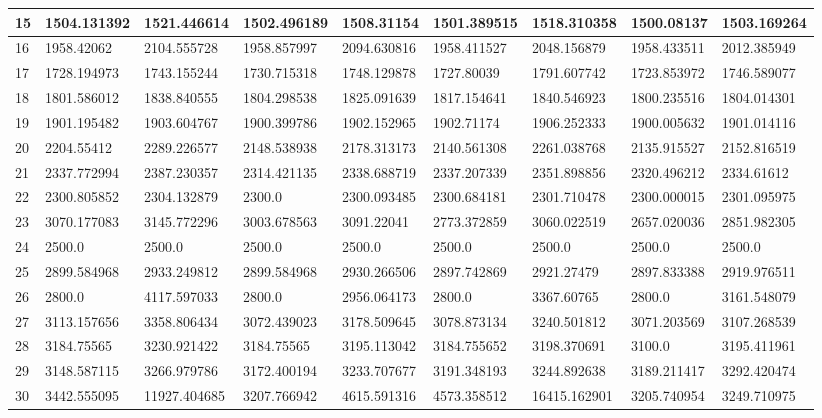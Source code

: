\begin{table*}[htbp]
\begin{tabular}{|p{0.8cm}|p{1.6cm}|p{1.6cm}|p{1.6cm}|p{1.6cm}|p{1.6cm}|p{1.6cm}|p{1.6cm}|p{1.6cm}|}
 \hline
15  & 1504.131392 & 1521.446614 & 1502.496189 & 1508.31154 & 1501.389515 & 1518.310358 & 1500.08137 & 1503.169264 \\ 
 \hline
16  & 1958.42062 & 2104.555728 & 1958.857997 & 2094.630816 & 1958.411527 & 2048.156879 & 1958.433511 & 2012.385949 \\ 
 \hline
17  & 1728.194973 & 1743.155244 & 1730.715318 & 1748.129878 & 1727.80039 & 1791.607742 & 1723.853972 & 1746.589077 \\ 
 \hline
18  & 1801.586012 & 1838.840555 & 1804.298538 & 1825.091639 & 1817.154641 & 1840.546923 & 1800.235516 & 1804.014301 \\ 
 \hline
19  & 1901.195482 & 1903.604767 & 1900.399786 & 1902.152965 & 1902.71174 & 1906.252333 & 1900.005632 & 1901.014116 \\ 
 \hline
20  & 2204.55412 & 2289.226577 & 2148.538938 & 2178.313173 & 2140.561308 & 2261.038768 & 2135.915527 & 2152.816519 \\ 
 \hline
21  & 2337.772994 & 2387.230357 & 2314.421135 & 2338.688719 & 2337.207339 & 2351.898856 & 2320.496212 & 2334.61612 \\ 
 \hline
22  & 2300.805852 & 2304.132879 & 2300.0 & 2300.093485 & 2300.684181 & 2301.710478 & 2300.000015 & 2301.095975 \\ 
 \hline
23  & 3070.177083 & 3145.772296 & 3003.678563 & 3091.22041 & 2773.372859 & 3060.022519 & 2657.020036 & 2851.982305 \\ 
 \hline
24  & 2500.0 & 2500.0 & 2500.0 & 2500.0 & 2500.0 & 2500.0 & 2500.0 & 2500.0 \\ 
 \hline
25  & 2899.584968 & 2933.249812 & 2899.584968 & 2930.266506 & 2897.742869 & 2921.27479 & 2897.833388 & 2919.976511 \\ 
 \hline
26  & 2800.0 & 4117.597033 & 2800.0 & 2956.064173 & 2800.0 & 3367.60765 & 2800.0 & 3161.548079 \\ 
 \hline
27  & 3113.157656 & 3358.806434 & 3072.439023 & 3178.509645 & 3078.873134 & 3240.501812 & 3071.203569 & 3107.268539 \\ 
 \hline
28  & 3184.75565 & 3230.921422 & 3184.75565 & 3195.113042 & 3184.755652 & 3198.370691 & 3100.0 & 3195.411961 \\ 
 \hline
29  & 3148.587115 & 3266.979786 & 3172.400194 & 3233.707677 & 3191.348193 & 3244.892638 & 3189.211417 & 3292.420474 \\ 
 \hline
30  & 3442.555095 & 11927.404685 & 3207.766942 & 4615.591316 & 4573.358512 & 16415.162901 & 3205.740954 & 3249.710975 \\
 \hline

 \end{tabular}
\end{table*}



